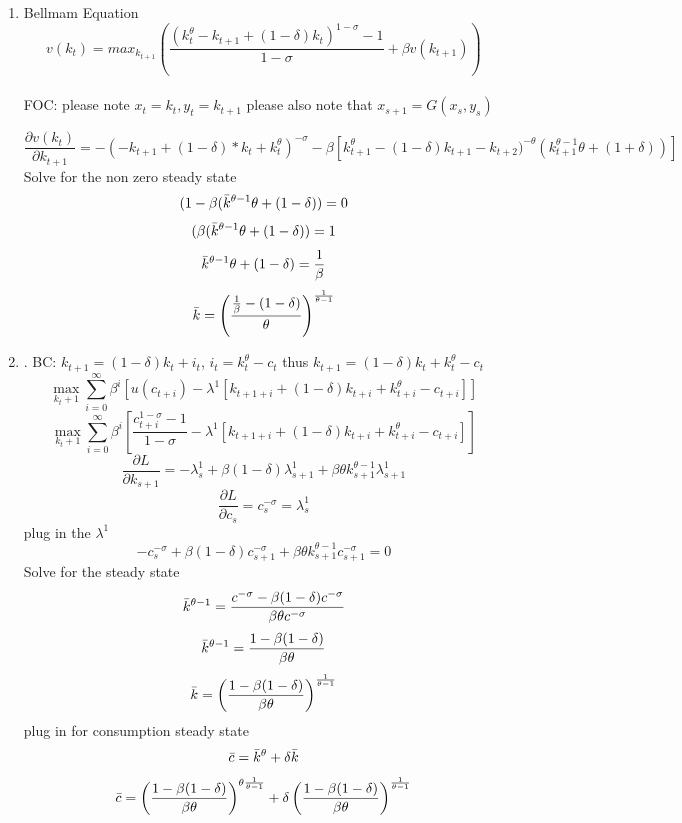 \begin{enumerate}
    \item  Bellmam Equation $$v(k_t)= max_{k_{t+1}} \left(\frac{(k_t^\theta -k_{t+1}+(1-\delta)k_t)^{1-\sigma}-1}{1-\sigma}+\beta v(k_{t+1}) \right)$$\\
    FOC: please note $x_t=k_t, y_t=k_{t+1}$ please also note that $x_{s+1}=G(x_s,y_s)$
    
    $$\frac{\partial v(k_t)}{\partial k_{t+1}}=-( -k_{t+1} + (1-\delta)*k_t +k_t^\theta)^{-\sigma}
   -\beta[k_{t+1}^\theta-(1-\delta)k_{t+1}-k_{t+2})^{-\theta}(k^{\theta-1}_{t+1}\theta+(1+\delta))]$$
   Solve for the non zero steady state 
   $$(1-\beta(\Bar{k}^{\theta-1}\theta+(1-\delta))=0$$
   $$(\beta(\Bar{k}^{\theta-1}\theta+(1-\delta))=1$$
   $$\Bar{k}^{\theta-1}\theta+(1-\delta)=\frac{1}{\beta}$$
   $$\Bar{k}=\left( \frac{\frac{1}{\beta}-(1-\delta)}{\theta}\right) ^{\frac{1}{\theta-1}}$$
   \item. BC: $k_{t+1} =(1-\delta)k_t+i_t$, $i_t=k_t^\theta-c_t$ thus $k_{t+1}=(1-\delta)k_t+k_t^\theta-c_t$
   $$\max_{k_t+1} \sum^\infty_{i=0} \beta^i[u(c_{t+i})-\lambda^1[k_{t+1+i}+(1-\delta)k_{t+i}+k_{t+i}^\theta-c_{t+i}]]$$
   $$\max_{k_t+1} \sum^\infty_{i=0} \beta^i[\frac{c_{t+i}^{1-\sigma}-1}{1-\sigma}-\lambda^1[k_{t+1+i}+(1-\delta)k_{t+i}+k_{t+i}^\theta-c_{t+i}]]$$
   $$\frac{\partial L}{\partial k_{s+1}}= -\lambda^1_s+\beta(1-\delta)\lambda^1_{s+1}+\beta \theta k^{\theta-1}_{s+1}\lambda^1_{s+1}$$
   $$\frac{\partial L}{\partial c_s}= c_s^{-\sigma}=\lambda^1_s$$
   plug in the $\lambda^1$ 
   $$-c_s^{-\sigma}+\beta(1-\delta)c_{s+1}^{-\sigma}+\beta \theta k_{s+1}^{\theta -1} c_{s+1}^{-\sigma}=0$$
   Solve for the steady state 
   $$\Bar{k}^{\theta-1}=\frac{ c^{-\sigma} -\beta(1-\delta)c^{-\sigma}}{\beta \theta c^{-\sigma}}$$
   $$\Bar{k}^{\theta-1}=\frac{1 -\beta(1-\delta)}{\beta \theta}$$
   $$\Bar{k}=\left (\frac{1 -\beta(1-\delta)}{\beta \theta} \right )^{\frac{1}{\theta-1}}$$
   plug in for consumption steady state
   $$\Bar{c}= \Bar{k}^\theta+\delta\Bar{k}$$
   $$\Bar{c}= \left (\frac{1 -\beta(1-\delta)}{\beta \theta} \right )^{\theta \frac{1}{\theta-1}}+\delta\left (\frac{1 -\beta(1-\delta)}{\beta \theta} \right )^{\frac{1}{\theta-1}}$$


\end{enumerate}
